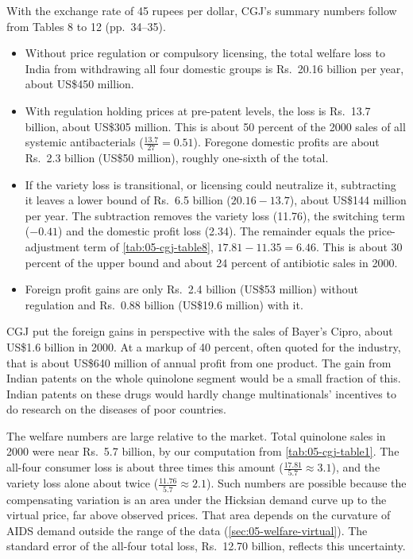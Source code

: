  With the exchange rate of 45 rupees per dollar, CGJ's summary numbers follow from
Tables 8 to 12 (pp.~34--35).
\begin{itemize}
\item Without price regulation or compulsory licensing, the total welfare loss to India from withdrawing all four
domestic groups is Rs.~20.16 billion per year, about US\$450 million.
\item With regulation holding prices at pre-patent levels, the loss is Rs.~13.7 billion, about US\$305 million. This
is about 50 percent of the 2000 sales of all systemic antibacterials ($\frac{13.7}{27} = 0.51$). Foregone domestic
profits are about Rs.~2.3 billion (US\$50 million), roughly one-sixth of the total.
\item If the variety loss is transitional, or licensing could neutralize it, subtracting it leaves a lower bound of
Rs.~6.5 billion ($20.16 - 13.7$), about US\$144 million per year. The subtraction removes the variety loss (11.76),
the switching term ($-0.41$) and the domestic profit loss (2.34). The remainder equals the price-adjustment term of
\cref{tab:05-cgj-table8}, $17.81 - 11.35 = 6.46$. This is about 30 percent of the upper bound and about
24 percent of antibiotic sales in 2000.
\item Foreign profit gains are only Rs.~2.4 billion (US\$53 million) without regulation and Rs.~0.88 billion
(US\$19.6 million) with it.
\end{itemize}
CGJ put the foreign gains in perspective with the sales of Bayer's Cipro, about US\$1.6 billion in 2000. At a
markup of 40 percent, often quoted for the industry, that is about US\$640 million of annual profit from one product.
The gain from Indian patents on the whole quinolone segment would be a small fraction of this. Indian patents on
these drugs would hardly change multinationals' incentives to do research on the diseases of poor countries.

The welfare numbers are large relative to the market. Total quinolone sales in 2000 were near Rs.~5.7 billion, by
our computation from \cref{tab:05-cgj-table1}. The all-four consumer loss is about three times this amount
($\frac{17.81}{5.7} \approx 3.1$), and the variety loss alone about twice ($\frac{11.76}{5.7} \approx 2.1$).
Such numbers are possible because the compensating variation is an area under the Hicksian demand curve
up to the virtual price, far above observed prices. That area depends on the curvature of AIDS demand outside the
range of the data (\cref{sec:05-welfare-virtual}). The standard error of the all-four total loss, Rs.~12.70 billion,
reflects this uncertainty.

